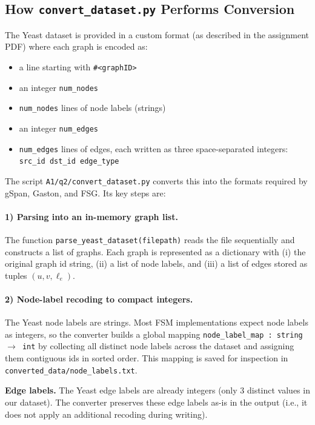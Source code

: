 \documentclass[11pt]{article}
\begin{document}
\subsection{How \texttt{convert\_dataset.py} Performs Conversion}

The Yeast dataset is provided in a custom format (as described in the assignment PDF) where each graph is encoded as:
\begin{itemize}
	\item a line starting with \texttt{\#<graphID>}
	\item an integer \texttt{num\_nodes}
	\item \texttt{num\_nodes} lines of node labels (strings)
	\item an integer \texttt{num\_edges}
	\item \texttt{num\_edges} lines of edges, each written as three space-separated integers:
	\texttt{src\_id dst\_id edge\_type}
\end{itemize}

The script \texttt{A1/q2/convert\_dataset.py} converts this into the formats required by gSpan, Gaston, and FSG. Its key steps are:

\paragraph{1) Parsing into an in-memory graph list.}
The function \texttt{parse\_yeast\_dataset(filepath)} reads the file sequentially and constructs a list of graphs.
Each graph is represented as a dictionary with (i) the original graph id string, (ii) a list of node labels, and (iii) a list of edges stored as tuples $(u,v,\ell_e)$.

\paragraph{2) Node-label recoding to compact integers.}
The Yeast node labels are strings. Most FSM implementations expect node labels as integers, so the converter builds a global mapping
\texttt{node\_label\_map : string $\to$ int} by collecting all distinct node labels across the dataset and assigning them contiguous ids in sorted order.
This mapping is saved for inspection in \texttt{converted\_data/node\_labels.txt}.

\noindent\textbf{Edge labels.} The Yeast edge labels are already integers (only 3 distinct values in our dataset). The converter preserves these edge labels as-is in the output (i.e., it does not apply an additional recoding during writing).
\end{document}
